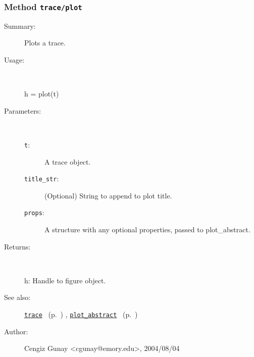 \subsubsection[Method \texttt{plot}]{Method \texttt{trace/plot}}%
%
\label{ref_trace__plot}%
\hypertarget{ref_trace__plot}{}%
\begin{description}
\item[Summary:]Plots a trace.
%
\item[Usage:]~%
\begin{lyxcode}%
h = plot(t)
%
\end{lyxcode}%
%
%
\item[Parameters:]~
\begin{description}%
\item[\texttt{t}:]
 A trace object.
\item[\texttt{title\_str}:]
 (Optional) String to append to plot title.
\item[\texttt{props}:]
 A structure with any optional properties, passed to plot\_abstract.
\end{description}%
%
\item[Returns:]~

	h: Handle to figure object.
%
%
\item[See also:]%
\hyperlink{ref_trace}{\texttt{trace}}%
\ (p.~\pageref{ref_trace})%
%
, \hyperlink{ref_plot_abstract}{\texttt{plot\_abstract}}%
\ (p.~\pageref{ref_plot_abstract})%
%
%
\item[Author:]%
Cengiz Gunay <cgunay@emory.edu>, 2004/08/04%
\end{description}
\methodline%
